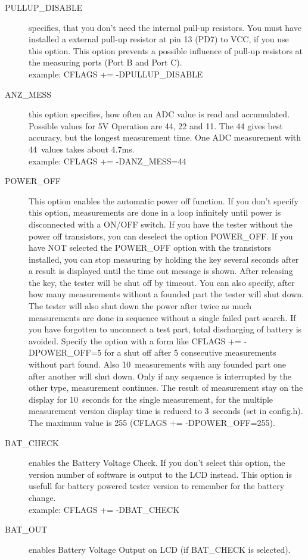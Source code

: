 \begin{description}
  \item[PULLUP\_DISABLE] specifies, that you don't need the internal pull-up resistors.
 You must have installed a external pull-up resistor at pin 13 (PD7) to VCC, if you use this option.
This option prevents a possible influence of pull-up resistors at the measuring ports (Port B and Port C).\\
example: CFLAGS += -DPULLUP\_DISABLE
  \item[ANZ\_MESS] this option specifies, how often an ADC value is read and accumulated.
Possible values for 5V Operation are 44, 22 and 11. The 44 gives best accuracy, but the longest measurement time.
One ADC measurement with 44~values takes about 4.7ms.\\
example: CFLAGS += -DANZ\_MESS=44
  \item[POWER\_OFF] This option enables the automatic power off function. If you don't specify this option,
 measurements are done in a loop infinitely  until power is disconnected with a ON/OFF switch.
If you have the tester without the power off transistors, you can deselect the option POWER\_OFF.
If you have NOT selected the POWER\_OFF option with the transistors installed,
you can stop measuring by holding the key several seconds after a result is displayed until the time out message is shown.
After releasing the key, the tester will be shut off by timeout.
You can also specify, after how many measurements without a founded part the tester will shut down.
The tester will also shut down the power after twice as much measurements are done in sequence without a
single failed part search. If you have forgotten to unconnect a test part, total discharging of battery is avoided. 
Specify the option with a form like CFLAGS += -DPOWER\_OFF=5 for a shut off after 5 consecutive measurements
without part found. Also 10~measurements with any founded part one after another will shut down.
Only if any sequence is interrupted by the other type, measurement continues.
The result of measurement stay on the display for 10~seconds for the single measurement, for the
multiple measurement version display time is reduced to 3~seconds (set in config.h).
The maximum value is 255 (CFLAGS += -DPOWER\_OFF=255).
  \item[BAT\_CHECK] enables the Battery Voltage Check. If you don't select this option, the version number of
software is output to the LCD instead.
This option is usefull for battery powered tester version to remember for the battery change.\\
example: CFLAGS += -DBAT\_CHECK
  \item[BAT\_OUT] enables Battery Voltage Output on LCD (if BAT\_CHECK is selected).

\end{description}
